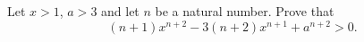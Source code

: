 Let $x>1$, $a>3$ and let $n$ be a natural number. Prove that
\[
(n+1)x^{n+2}-3(n+2)x^{n+1}+a^{n+2}>0 .
\]
